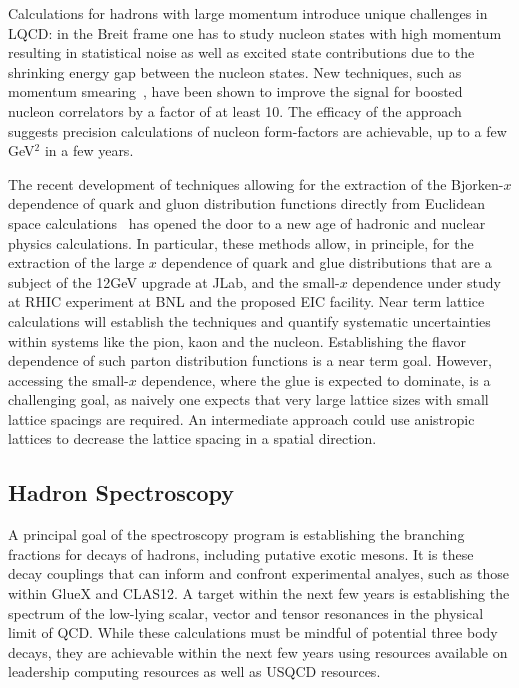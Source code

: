 Calculations for hadrons with large momentum introduce unique challenges in LQCD: in the Breit frame one 
has to study nucleon states with high momentum 
resulting in statistical noise as well as excited state contributions due to the
shrinking energy gap between the nucleon states.
New techniques, such as momentum smearing~\cite{Bali:2016lva,Syritsyn:2017jrc}, have been shown to improve
the signal for boosted nucleon correlators by a factor of at least 10. The efficacy of the approach suggests precision calculations of nucleon form-factors are achievable, up to a few GeV$^2$ in a few years.


The recent development of techniques allowing for the extraction of the Bjorken-$x$ dependence of quark and gluon distribution functions directly from Euclidean space calculations~\cite{Ji:2001wha} has opened the door to a new age of hadronic and nuclear physics calculations. In particular, these methods allow, in principle, for the extraction of the large $x$ dependence of quark and glue distributions that are a subject of the 12GeV upgrade at JLab, and the small-$x$ dependence under study at RHIC experiment at BNL and the proposed EIC facility. Near term  lattice calculations will establish the techniques and quantify systematic uncertainties within systems like the pion, kaon and the nucleon. Establishing the flavor dependence of such parton distribution functions is a near term goal. However, accessing the small-$x$ dependence, where the glue is expected to dominate, is a challenging goal, as naively one expects that very large lattice sizes with small lattice spacings are required. An intermediate approach could use anistropic lattices to decrease the lattice spacing in a spatial direction.%



\subsection{Hadron Spectroscopy}

A principal goal of the spectroscopy program is establishing the branching fractions for decays of hadrons, including putative exotic mesons. It is these decay couplings that can inform and confront experimental analyes, such as those within GlueX and CLAS12. A target within the next few years is establishing the spectrum of the low-lying scalar, vector and tensor resonances in the physical limit of QCD. While these calculations must be mindful of potential three body decays, they are achievable within the next few years using resources available on leadership computing resources as well as USQCD resources.

